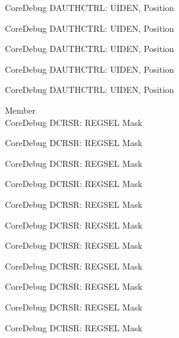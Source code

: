 \begin{DoxyRefList}
\label{deprecated__deprecated000530}%
%
Core\+Debug DAUTHCTRL\+: UIDEN, Position 

\label{deprecated__deprecated000632}%
%
Core\+Debug DAUTHCTRL\+: UIDEN, Position 

\label{deprecated__deprecated000738}%
%
Core\+Debug DAUTHCTRL\+: UIDEN, Position 

\label{deprecated__deprecated001189}%
%
Core\+Debug DAUTHCTRL\+: UIDEN, Position 

\label{deprecated__deprecated001291}%
%
Core\+Debug DAUTHCTRL\+: UIDEN, Position  
\item[Member \doxylink{group___c_m_s_i_s___core_debug_ga17cafbd72b55030219ce5609baa7c01d}{Core\+Debug\+\_\+\+DCRSR\+\_\+\+REGSEL\+\_\+\+Msk} ]\hfill \\
\label{deprecated__deprecated000044}%
%
Core\+Debug DCRSR\+: REGSEL Mask 

\label{deprecated__deprecated000132}%
%
Core\+Debug DCRSR\+: REGSEL Mask 

\label{deprecated__deprecated000188}%
%
Core\+Debug DCRSR\+: REGSEL Mask 

\label{deprecated__deprecated000271}%
%
Core\+Debug DCRSR\+: REGSEL Mask 

\label{deprecated__deprecated000330}%
%
Core\+Debug DCRSR\+: REGSEL Mask 

\label{deprecated__deprecated000406}%
%
Core\+Debug DCRSR\+: REGSEL Mask 

\label{deprecated__deprecated000495}%
%
Core\+Debug DCRSR\+: REGSEL Mask 

\label{deprecated__deprecated000597}%
%
Core\+Debug DCRSR\+: REGSEL Mask 

\label{deprecated__deprecated000703}%
%
Core\+Debug DCRSR\+: REGSEL Mask 

\label{deprecated__deprecated000791}%
%
Core\+Debug DCRSR\+: REGSEL Mask 

\label{deprecated__deprecated000847}%
%
Core\+Debug DCRSR\+: REGSEL Mask 


\end{DoxyRefList}
